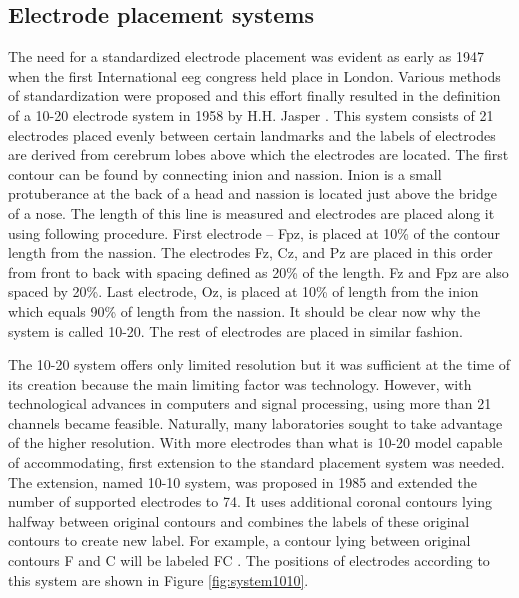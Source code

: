 \subsection{Electrode placement systems}
\label{ssec:elPlacement}
The need for a standardized electrode placement was evident as early as 1947 when
the first International \gls{eeg} congress held place in London. Various methods of
standardization were proposed and this effort finally resulted in the definition
of a 10-20 electrode system in 1958 by H.H. Jasper \cite{placeSys}. 
This system consists of 21 electrodes placed evenly between certain landmarks
and the labels of electrodes are derived from cerebrum lobes above which the electrodes
are located. The first contour can be found by connecting inion and nassion.
Inion is a small protuberance at the back of a head and nassion is located just
above the bridge of a nose. The length of this line is measured and electrodes are
placed along it using following procedure. First electrode -- Fpz, is placed at
10\% of the contour length from the nassion. The electrodes Fz, Cz, and Pz are placed in this
order from front to back with spacing defined as 20\% of the length. Fz and Fpz are also
spaced by 20\%. Last electrode, Oz, is placed at 10\% of length from the inion
which equals 90\% of length from the nassion. It should be clear now why the system
is called 10-20. The rest of electrodes are placed in similar fashion.

The 10-20 system offers only limited resolution but it was sufficient at the
time of its creation because the main limiting factor was technology. However,
with technological advances in computers and signal processing, using more than
21 channels became feasible. Naturally, many laboratories sought to take advantage of the
higher resolution. With more electrodes than what is 10-20 model capable of
accommodating, first extension to the standard placement system was needed. The
extension, named 10-10 system, was proposed in 1985 and extended the number of supported
electrodes to 74. It uses additional coronal contours lying halfway between
original contours and combines the labels of these original contours to create
new label. For example, a contour lying between original contours F and C will
be labeled FC \cite{placeSys}. The positions of electrodes according to this
system are shown in Figure \ref{fig:system1010}. 

